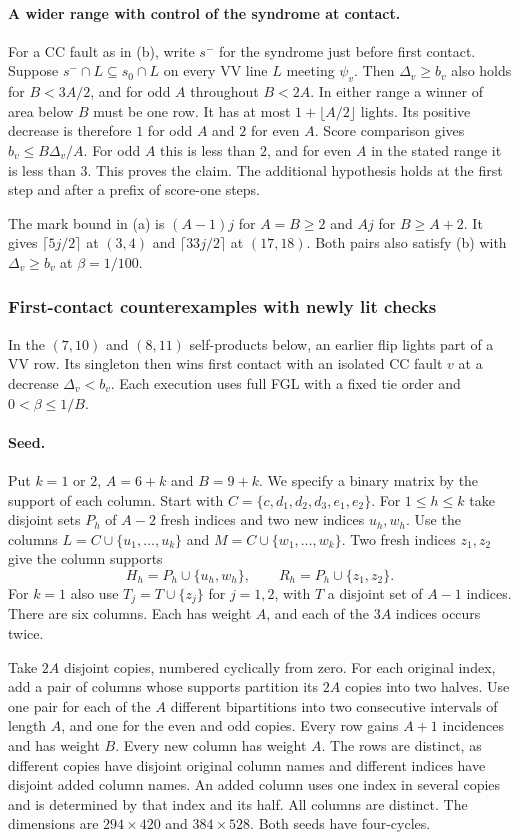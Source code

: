 \documentclass[10pt,twocolumn]{article}
\theoremstyle{definition}
\begin{document}
\paragraph{A wider range with control of the syndrome at contact.}
For a CC fault as in (b), write $s^-$ for the syndrome just before
first contact. Suppose $s^-\cap L\subseteq s_0\cap L$ on every VV
line $L$ meeting $\psi_v$. Then $\Delta_v\ge b_v$ also holds for
$B<3A/2$, and for odd $A$ throughout $B<2A$. In either range a
winner of area below $B$ must be one row. It has at most
$1+\lfloor A/2\rfloor$ lights. Its positive decrease is therefore
$1$ for odd $A$ and $2$ for even $A$. Score comparison gives
$b_v\le B\Delta_v/A$. For odd $A$ this is less than $2$, and for
even $A$ in the stated range it is less than $3$. This proves the
claim. The additional hypothesis holds at the first step and after
a prefix of score-one steps.

The mark bound in (a) is $(A-1)j$ for $A=B\ge2$ and $Aj$ for
$B\ge A+2$. It gives $\lceil5j/2\rceil$ at $(3,4)$ and
$\lceil33j/2\rceil$ at $(17,18)$. Both pairs also satisfy (b)
with $\Delta_v\ge b_v$ at $\beta=1/100$.

\subsubsection{First-contact counterexamples with newly lit checks}
\label{app:contact-examples}
In the $(7,10)$ and $(8,11)$ self-products below, an earlier flip
lights part of a VV row. Its singleton then wins first contact with
an isolated CC fault $v$ at a decrease $\Delta_v<b_v$. Each execution
uses full FGL with a fixed tie order and $0<\beta\le1/B$.

\paragraph{Seed.}
Put $k=1$ or $2$, $A=6+k$ and $B=9+k$. We specify a binary
matrix by the support of each column. Start with
$C=\{c,d_1,d_2,d_3,e_1,e_2\}$. For $1\le h\le k$ take disjoint
sets $P_h$ of $A-2$ fresh indices and two new indices $u_h,w_h$.
Use the columns $L=C\cup\{u_1,\ldots,u_k\}$ and
$M=C\cup\{w_1,\ldots,w_k\}$. Two fresh indices $z_1,z_2$ give
the column supports
\[
 H_h=P_h\cup\{u_h,w_h\},\qquad R_h=P_h\cup\{z_1,z_2\}.
\]
For $k=1$ also use $T_j=T\cup\{z_j\}$ for $j=1,2$, with $T$ a
disjoint set of $A-1$ indices. There are six columns. Each has
weight $A$, and each of the $3A$ indices occurs twice.

Take $2A$ disjoint copies, numbered cyclically from zero. For each
original index, add a pair of columns whose supports partition its
$2A$ copies into two halves. Use one pair for each of the $A$
different bipartitions into two consecutive intervals of length $A$,
and one for the even and odd copies. Every row gains $A+1$ incidences
and has weight $B$. Every new column has weight $A$. The rows are
distinct, as different copies have disjoint original column names
and different indices have disjoint added column names. An added
column uses one index in several copies and is determined by that
index and its half. All columns are distinct. The dimensions are $294\times420$ and
$384\times528$. Both seeds have four-cycles.
\end{document}
